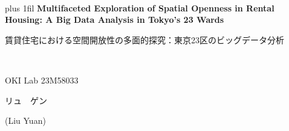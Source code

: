 \documentclass[11pt,a4paper]{article}
\begin{document}
\begin{center}
~\\
{\fontsize{12}{14}\selectfont \spaceskip=0pt plus 1fil \textbf{Multifaceted Exploration of Spatial Openness in Rental Housing: A Big Data Analysis in Tokyo's 23 Wards}}\\

\begin{CJK}{UTF8}{min}
{\fontsize{11}{11}\selectfont 賃貸住宅における空間開放性の多面的探究：東京23区のビッグデータ分析}
\end{CJK}\\
\end{center}
\begin{flushright}
{\fontsize{11}{13}\selectfont \spaceskip=0pt OKI Lab  23M58033 \begin{CJK}{UTF8}{min}リュ　ゲン\end{CJK} (Liu Yuan)}
\end{flushright}
\end{document}
